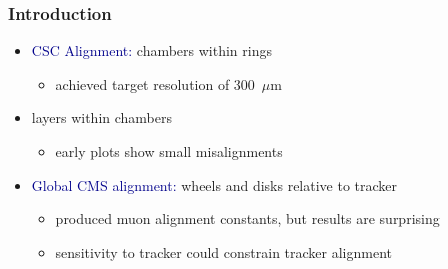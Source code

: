 \documentclass[compress]{beamer}
\begin{document}
\begin{frame}
\frametitle{Introduction}
\begin{itemize}\setlength{\itemsep}{0.5 cm}
\item \textcolor{darkblue}{CSC Alignment:} chambers within rings
\begin{itemize}
\item achieved target resolution of 300~$\mu$m
\end{itemize}

\item layers within chambers
\begin{itemize}
\item early plots show small misalignments
\end{itemize}

\item \textcolor{darkblue}{Global CMS alignment:} wheels and disks relative to tracker
\begin{itemize}\setlength{\itemsep}{0.1 cm}
\item produced muon alignment constants, but results are surprising
\item sensitivity to tracker could constrain tracker alignment
\end{itemize}
\end{itemize}
\end{frame}

\end{document}
